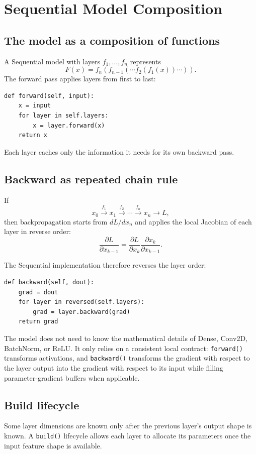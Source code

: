 \documentclass[11pt,a4paper]{article}
\newcommand{\pd}[2]{\frac{\partial #1}{\partial #2}}
\newcommand{\code}[1]{\texttt{#1}}
\begin{document}
\section{Sequential Model Composition}

\subsection{The model as a composition of functions}

A Sequential model with layers $f_1,\ldots,f_n$ represents
\[
F(x)=f_n(f_{n-1}(\cdots f_2(f_1(x))\cdots)).
\]
The forward pass applies layers from first to last:
\begin{lstlisting}
def forward(self, input):
    x = input
    for layer in self.layers:
        x = layer.forward(x)
    return x
\end{lstlisting}

Each layer caches only the information it needs for its own backward pass.

\subsection{Backward as repeated chain rule}

If
\[
x_0\xrightarrow{f_1}x_1\xrightarrow{f_2}\cdots\xrightarrow{f_n}x_n\xrightarrow{}L,
\]
then backpropagation starts from $dL/dx_n$ and applies the local Jacobian of each layer in reverse order:
\[
\pd{L}{x_{k-1}}
=
\pd{L}{x_k}
\pd{x_k}{x_{k-1}}.
\]

The Sequential implementation therefore reverses the layer order:
\begin{lstlisting}
def backward(self, dout):
    grad = dout
    for layer in reversed(self.layers):
        grad = layer.backward(grad)
    return grad
\end{lstlisting}

The model does not need to know the mathematical details of Dense, Conv2D, BatchNorm, or ReLU. It only relies on a consistent local contract: \code{forward()} transforms activations, and \code{backward()} transforms the gradient with respect to the layer output into the gradient with respect to its input while filling parameter-gradient buffers when applicable.

\subsection{Build lifecycle}

Some layer dimensions are known only after the previous layer's output shape is known. A \code{build()} lifecycle allows each layer to allocate its parameters once the input feature shape is available.
\end{document}
